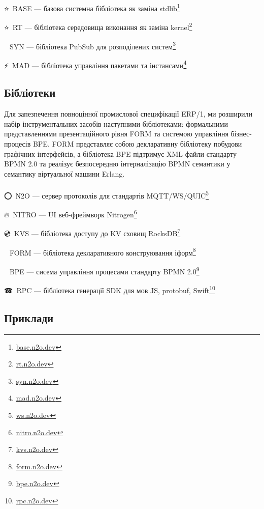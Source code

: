 \setmainfont{Segoe UI Emoji}⭐\setmainfont{Geometria}\ BASE --- базова системна бібліотека як заміна stdlib\footnote{\url{base.n2o.dev}}

\setmainfont{Segoe UI Emoji}⭐\setmainfont{Geometria}\ RT --- бібліотека середовища виконання як заміна kernel\footnote{\url{rt.n2o.dev}}

\setmainfont{Segoe UI Emoji}📨\setmainfont{Geometria}\ SYN --- бібліотека PubSub для розподілених систем\footnote{\url{syn.n2o.dev}}

\setmainfont{Segoe UI Emoji}⚡\setmainfont{Geometria}\ MAD --- бібліотека управління пакетами та інстансами\footnote{\url{mad.n2o.dev}}

\newpage
\subsection{Бібліотеки}

Для запезпечення повноцінної промислової специфікації ERP/1, ми розширили
набір інструментальних засобів наступними бібліотеками: формальними представленнями
презентаційного рівня FORM та системою управління бізнес-процесів BPE. FORM представляє
собою декларативну бібліотеку побудови графічних інтерфейсів, а бібліотека BPE
підтримує XML файли стандарту BPMN 2.0 та реалізує безпосередню інтерналізацію
BPMN семантики у семантику віртуальної машини Erlang. \\
\\ \indent
\setmainfont{Segoe UI Emoji}⭕\setmainfont{Geometria}\ N2O --- сервер протоколів для стандартів MQTT/WS/QUIC\footnote{\url{ws.n2o.dev}}

\setmainfont{Segoe UI Emoji}🔥\setmainfont{Geometria}\ NITRO --- UI веб-фреймворк Nitrogen\footnote{\url{nitro.n2o.dev}}

\setmainfont{Segoe UI Emoji}💿\setmainfont{Geometria}\ KVS --- бібліотека доступу до KV сховищ RocksDB\footnote{\url{kvs.n2o.dev}}

\setmainfont{Segoe UI Emoji}📜\setmainfont{Geometria}\ FORM --- бібліотека декларативного конструювання іформ\footnote{\url{form.n2o.dev}}

\setmainfont{Segoe UI Emoji}💠\setmainfont{Geometria}\ BPE --- сисема управління процесами стандарту BPMN 2.0\footnote{\url{bpe.n2o.dev}}

\setmainfont{Segoe UI Emoji}☎\setmainfont{Geometria}\ RPC --- бібліотека генерації SDK для мов JS, protobuf, Swift\footnote{\url{rpc.n2o.dev}}

\subsection{Приклади}

